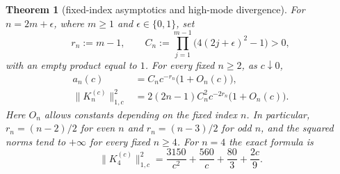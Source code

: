 ﻿\documentclass[11pt]{article}
\newtheorem{theorem}{Theorem}[section]
\begin{document}
\begin{theorem}[fixed-index asymptotics and high-mode divergence]\label{thm:high}
	For $n=2m+\epsilon$, where $m\ge1$ and $\epsilon\in\{0,1\}$, set
	\begin{equation}
		r_n:=m-1,\qquad
		C_n:=\prod_{j=1}^{m-1}\bigl(4(2j+\epsilon)^2-1\bigr)>0,
		\label{eq:parity-constants}
	\end{equation}
	with an empty product equal to $1$.  For every fixed $n\ge2$, as
	$c\downarrow0$,
	\begin{equation}
		\begin{aligned}
			a_n(c)&=C_n c^{-r_n}\bigl(1+O_n(c)\bigr),\\
			\|K_n^{(c)}\|_{1,c}^2
			&=2(2n-1)C_n^2 c^{-2r_n}\bigl(1+O_n(c)\bigr).
		\end{aligned}
		\label{eq:fixed-asymptotics}
	\end{equation}
	Here $O_n$ allows constants depending on the fixed index $n$.
	In particular, $r_n=(n-2)/2$ for even $n$ and $r_n=(n-3)/2$ for odd
	$n$, and the squared norms tend to $+\infty$ for every fixed $n\ge4$.
	For $n=4$ the exact formula is
	\begin{equation}
		\|K_4^{(c)}\|_{1,c}^2
		=\frac{3150}{c^2}+\frac{560}{c}+\frac{80}{3}+\frac{2c}{9}.
		\label{eq:norm-four}
	\end{equation}
\end{theorem}
\end{document}
